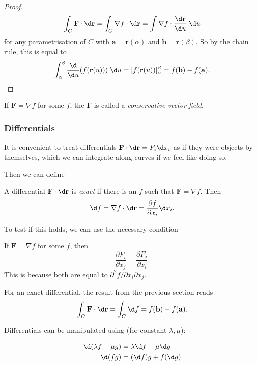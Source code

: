 \documentclass[a4paper]{article}
\begin{document}
\begin{proof}
  \[
    \int_C \mathbf{F}\cdot \d \mathbf{r} = \int_C\nabla f\cdot \d \mathbf{r} = \int \nabla f\cdot \frac{\d \mathbf{r}}{\d u}\; \d u
  \]
  for any parametrisation of $C$ with $\mathbf{a} = \mathbf{r}(\alpha)$ and $\mathbf{b} = \mathbf{r}(\beta)$. So by the chain rule, this is equal to
  \[
    \int_\alpha^\beta \frac{\d }{\d u} (f(\mathbf{r}(u))) \;\d u = [f(\mathbf{r}(u))]_\alpha^\beta = f(\mathbf{b}) - f(\mathbf{a}).
  \]
\end{proof}

\begin{defi}
  If $\mathbf{F} = \nabla f$ for some $f$, the $\mathbf{F}$ is called a \emph{conservative vector field}.
\end{defi}

\subsubsection{Differentials}
It is convenient to treat differentials $\mathbf{F}\cdot \d \mathbf{r} = F_i \d x_i$ as if they were objects by themselves, which we can integrate along curves if we feel like doing so.

Then we can define
\begin{defi}
  A differential $\mathbf{F}\cdot\d \mathbf{r}$ is \emph{exact} if there is an $f$ such that $\mathbf{F} = \nabla f$. Then
  \[
    \d f = \nabla f\cdot \d \mathbf{r} = \frac{\partial f}{\partial x_i} \d x_i.
  \]
\end{defi}

To test if this holds, we can use the necessary condition
\begin{prop}
  If $\mathbf{F} = \nabla f$ for some $f$, then
  \[
    \frac{\partial F_i}{\partial x_j} = \frac{\partial F_j}{\partial x_i}.
  \]
  This is because both are equal to $\partial^2 f/\partial x_i\partial x_j$.
\end{prop}

For an exact differential, the result from the previous section reads
\[
  \int_C \mathbf{F}\cdot \d \mathbf{r} = \int_C \d f = f(\mathbf{b}) - f(\mathbf{a}).
\]

Differentials can be manipulated using (for constant $\lambda, \mu$):
\begin{prop}
  \begin{align*}
    \d (\lambda f + \mu g) &= \lambda \d f + \mu \d g\\
    \d (fg) &= (\d f)g + f(\d g)
  \end{align*}
\end{prop}
\end{document}
